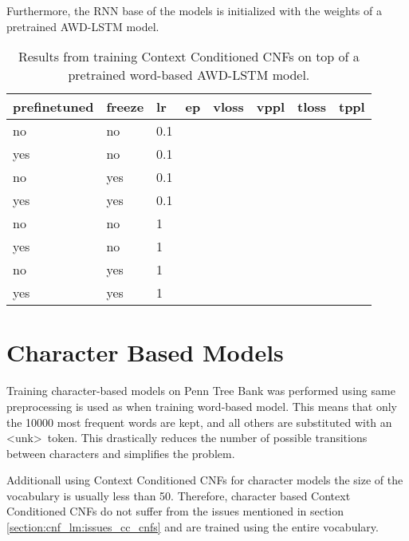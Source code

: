 Furthermore, the RNN base of the models is initialized with the weights of a pretrained AWD-LSTM model.

\begin{table}[]
\centering
\caption{Results from training Context Conditioned CNFs on top of a pretrained word-based AWD-LSTM model.}
\begin{tabular}{|l|l|l|l|l|l|l|l|}
\hline
\textbf{prefinetuned} & \textbf{freeze} & \textbf{lr} & \textbf{ep} & \textbf{vloss} & \textbf{vppl} & \textbf{tloss} & \textbf{tppl} \\ \hline
no           & no     & 0.1 &    &       &      &       &      \\ \hline
yes          & no     & 0.1 &    &       &      &       &      \\ \hline
no           & yes    & 0.1 &    &       &      &       &      \\ \hline
yes          & yes    & 0.1 &    &       &      &       &      \\ \hline
no           & no     & 1   &    &       &      &       &      \\ \hline
yes          & no     & 1   &    &       &      &       &      \\ \hline
no           & yes    & 1   &    &       &      &       &      \\ \hline
yes          & yes    & 1   &    &       &      &       &      \\ \hline
\end{tabular}
\end{table}

\section{Character Based Models}

Training character-based models on Penn Tree Bank \citet{mikolov2011empirical} was performed using same preprocessing is used as when training word-based model. This means that only the 10000 most frequent words are kept, and all others are substituted with an \textless unk\textgreater \ token. This drastically reduces the number of possible transitions between characters and simplifies the problem.

Additionall using Context Conditioned CNFs for character models the size of the vocabulary is usually less than 50. Therefore, character based Context Conditioned CNFs do not suffer from the issues mentioned in section \ref{section:cnf_lm:issues_cc_cnfs} and are trained using the entire vocabulary.

